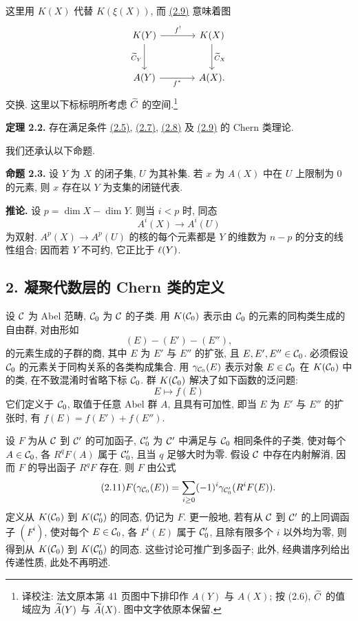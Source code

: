 这里用 $K(X)$ 代替 $K(\xi(X))$, 而 \hyperlink{sga6.e00.eq.2-9}{(2.9)} 意味着图
\[
\begin{tikzcd}[column sep=large,row sep=large]
K(Y) \arrow[r,"f^!"] \arrow[d,"\Ctil_Y"'] & K(X) \arrow[d,"\Ctil_X"]\\
A(Y) \arrow[r,"f^*"'] & A(X).
\end{tikzcd}
\]
交换. 这里以下标标明所考虑 $\widetilde C$ 的空间.\footnote{译校注: 法文原本第 41 页图中下排印作 $A(Y)$ 与 $A(X)$; 按 (2.6), $\widetilde C$ 的值域应为 $\widetilde A(Y)$ 与 $\widetilde A(X)$. 图中文字依原本保留.}

\textbf{定理 2.2.} 存在满足条件 \hyperlink{sga6.e00.eq.2-5.occ2}{(2.5)}, \hyperlink{sga6.e00.eq.2-7}{(2.7)}, \hyperlink{sga6.e00.eq.2-8}{(2.8)} 及 \hyperlink{sga6.e00.eq.2-9}{(2.9)} 的 Chern 类理论.

我们还承认以下命题.

\textbf{命题 2.3.} 设 $Y$ 为 $X$ 的闭子集, $U$ 为其补集. 若 $x$ 为 $A(X)$ 中在 $U$ 上限制为 $0$ 的元素, 则 $x$ 存在以 $Y$ 为支集的闭链代表.

\textbf{推论.} 设 $p=\dim X-\dim Y$. 则当 $i<p$ 时, 同态
\[
 A^i(X)\longrightarrow A^i(U)
\]
为双射. $A^p(X)\to A^p(U)$ 的核的每个元素都是 $Y$ 的维数为 $n-p$ 的分支的线性组合; 因而若 $Y$ 不可约, 它正比于 $\ell(Y)$.

\subsection*{2. 凝聚代数层的 Chern 类的定义}

设 $\mathcal C$ 为 Abel 范畴, $\mathcal C_0$ 为 $\mathcal C$ 的子类. 用 $K(\mathcal C_0)$ 表示由 $\mathcal C_0$ 的元素的同构类生成的自由群, 对由形如
\[
(E)-(E')-(E''),
\]
的元素生成的子群的商, 其中 $E$ 为 $E'$ 与 $E''$ 的扩张, 且 $E,E',E''\in\mathcal C_0$. 必须假设 $\mathcal C_0$ 的元素关于同构关系的各类构成集合. 用 $\gamma_{\mathcal C_0}(E)$ 表示对象 $E\in\mathcal C_0$ 在 $K(\mathcal C_0)$ 中的类, 在不致混淆时省略下标 $\mathcal C_0$. 群 $K(\mathcal C_0)$ 解决了如下函数的泛问题:
\[
E\longmapsto f(E)
\]
它们定义于 $\mathcal C_0$, 取值于任意 Abel 群 $A$, 且具有可加性, 即当 $E$ 为 $E'$ 与 $E''$ 的扩张时, 有 $f(E)=f(E')+f(E'')$.

设 $F$ 为从 $\mathcal C$ 到 $\mathcal C'$ 的可加函子, $\mathcal C'_0$ 为 $\mathcal C'$ 中满足与 $\mathcal C_0$ 相同条件的子类, 使对每个 $A\in\mathcal C_0$, 各 $R^qF(A)$ 属于 $\mathcal C'_0$, 且当 $q$ 足够大时为零. 假设 $\mathcal C$ 中存在内射解消, 因而 $F$ 的导出函子 $R^qF$ 存在. 则 $F$ 由公式
\begin{equation}\tag{2.11}
 F(\gamma_{\mathcal C_0}(E))=\sum_{i\geq 0}(-1)^i\gamma_{\mathcal C'_0}(R^iF(E)).
\end{equation}
定义从 $K(\mathcal C_0)$ 到 $K(\mathcal C'_0)$ 的同态, 仍记为 $F$. 更一般地, 若有从 $\mathcal C$ 到 $\mathcal C'$ 的上同调函子 $(F^i)$, 使对每个 $E\in\mathcal C_0$, 各 $F^i(E)$ 属于 $\mathcal C'_0$, 且除有限多个 $i$ 以外均为零, 则得到从 $K(\mathcal C_0)$ 到 $K(\mathcal C'_0)$ 的同态. 这些讨论可推广到多函子; 此外, 经典谱序列给出传递性质, 此处不再明述.

